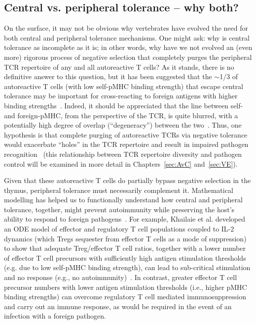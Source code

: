 \subsection{Central vs. peripheral tolerance -- why both?}
\label{sec:intro_autoimmunity_whyCentralAndPeripheral}

On the surface, it may not be obvious why vertebrates have evolved the need for both central and peripheral tolerance mechanisms. One might ask: why is central tolerance as incomplete as it is; in other words, why have we not evolved an (even more) rigorous process of negative selection that completely purges the peripheral TCR repertoire of any and all autoreactive T cells? As it stands, there is no definitive answer to this question, but it has been suggested that the $\sim$1/3 of autoreactive T cells (with low self-pMHC binding strength) that escape central tolerance may be important for cross-reacting to foreign antigens with higher binding strengths~\cite{sandberg2000t,bouneaud2000impact,this2021strength}. Indeed, it should be appreciated that the line between self- and foreign-pMHC, from the perspective of the TCR, is quite blurred, with a potentially high degree of overlap (``degeneracy'') between the two~\cite{calis2012degenerate}. Thus, one hypothesis is that complete purging of autoreactive TCRs via negative tolerance would exacerbate ``holes'' in the TCR repertoire and result in impaired pathogen recognition~\cite{this2021strength} (this relationship between TCR repertoire diversity and pathogen control will be examined in more detail in Chapters~\ref{sec:AvC} and~\ref{sec:VE}).

Given that these autoreactive T cells do partially bypass negative selection in the thymus, peripheral tolerance must necessarily complement it. Mathematical modelling has helped us to functionally understand how central and peripheral tolerance, together, might prevent autoimmunity while preserving the host's ability to respond to foreign pathogens~\cite{borghans1998crossreactivity,borghans1999specific,jaberi2014autoimmune}. For example, Khailaie et al. developed an ODE model of effector and regulatory T cell populations coupled to IL-2 dynamics (which Tregs sequester from effector T cells as a mode of suppression) to show that adequate Treg/effector T cell ratios, together with a lower number of effector T cell precursors with sufficiently high antigen stimulation thresholds (e.g. due to low self-pMHC binding strength), can lead to sub-critical stimulation and no response (e.g., no autoimmunity)~\cite{khailaie2013mathematical}. In contrast, greater effector T cell precursor numbers with lower antigen stimulation thresholds (i.e., higher pMHC binding strengths) can overcome regulatory T cell mediated immunosuppression and carry out an immune response, as would be required in the event of an infection with a foreign pathogen.

